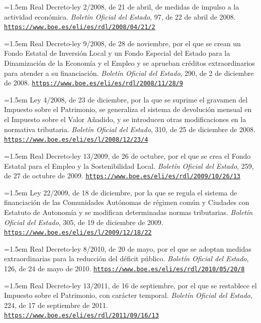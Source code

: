 \documentclass[10pt,a4paper]{article}
\begin{document}
\noindent\hangindent=1.5em Real Decreto-ley 2/2008, de 21 de abril, de medidas de impulso a la actividad económica. \textit{Boletín Oficial del Estado}, 97, de 22 de abril de 2008. \href{https://www.boe.es/eli/es/rdl/2008/04/21/2}{\nolinkurl{https://www.boe.es/eli/es/rdl/2008/04/21/2}}

\noindent\hangindent=1.5em Real Decreto-ley 9/2008, de 28 de noviembre, por el que se crean un Fondo Estatal de Inversión Local y un Fondo Especial del Estado para la Dinamización de la Economía y el Empleo y se aprueban créditos extraordinarios para atender a su financiación. \textit{Boletín Oficial del Estado}, 290, de 2 de diciembre de 2008. \href{https://www.boe.es/eli/es/rdl/2008/11/28/9}{\nolinkurl{https://www.boe.es/eli/es/rdl/2008/11/28/9}}

\noindent\hangindent=1.5em Ley 4/2008, de 23 de diciembre, por la que se suprime el gravamen del Impuesto sobre el Patrimonio, se generaliza el sistema de devolución mensual en el Impuesto sobre el Valor Añadido, y se introducen otras modificaciones en la normativa tributaria. \textit{Boletín Oficial del Estado}, 310, de 25 de diciembre de 2008. \href{https://www.boe.es/eli/es/l/2008/12/23/4}{\nolinkurl{https://www.boe.es/eli/es/l/2008/12/23/4}}

\noindent\hangindent=1.5em Real Decreto-ley 13/2009, de 26 de octubre, por el que se crea el Fondo Estatal para el Empleo y la Sostenibilidad Local. \textit{Boletín Oficial del Estado}, 259, de 27 de octubre de 2009. \href{https://www.boe.es/eli/es/rdl/2009/10/26/13}{\nolinkurl{https://www.boe.es/eli/es/rdl/2009/10/26/13}}

\noindent\hangindent=1.5em Ley 22/2009, de 18 de diciembre, por la que se regula el sistema de financiación de las Comunidades Autónomas de régimen común y Ciudades con Estatuto de Autonomía y se modifican determinadas normas tributarias. \textit{Boletín Oficial del Estado}, 305, de 19 de diciembre de 2009. \href{https://www.boe.es/eli/es/l/2009/12/18/22}{\nolinkurl{https://www.boe.es/eli/es/l/2009/12/18/22}}

\noindent\hangindent=1.5em Real Decreto-ley 8/2010, de 20 de mayo, por el que se adoptan medidas extraordinarias para la reducción del déficit público. \textit{Boletín Oficial del Estado}, 126, de 24 de mayo de 2010. \href{https://www.boe.es/eli/es/rdl/2010/05/20/8}{\nolinkurl{https://www.boe.es/eli/es/rdl/2010/05/20/8}}

\noindent\hangindent=1.5em Real Decreto-ley 13/2011, de 16 de septiembre, por el que se restablece el Impuesto sobre el Patrimonio, con carácter temporal. \textit{Boletín Oficial del Estado}, 224, de 17 de septiembre de 2011. \href{https://www.boe.es/eli/es/rdl/2011/09/16/13}{\nolinkurl{https://www.boe.es/eli/es/rdl/2011/09/16/13}}
\end{document}
